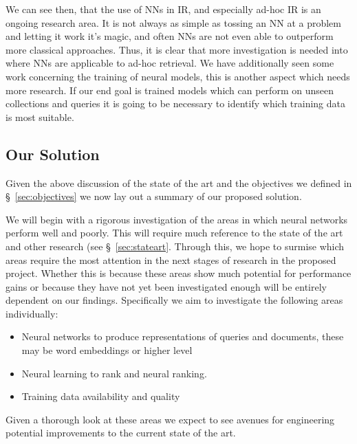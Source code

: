 \documentclass[11pt,english,twocolumn]{article}
\begin{document}
We can see then, that the use of NNs in IR, and especially ad-hoc IR is an ongoing research area. It is not always as simple as tossing an NN at a problem and letting it work it's magic, and often NNs are not even able to outperform more classical approaches.
Thus, it is clear that more investigation is needed into where NNs are applicable to ad-hoc retrieval.
We have additionally seen some work concerning the training of neural models, this is another aspect which needs more research. If our end goal is trained models which can perform on unseen collections and queries it is going to be necessary to identify which training data is most suitable.

\subsection{Our Solution}\label{sec:our-solution}
Given the above discussion of the state of the art and the objectives we defined in \S~\ref{sec:objectives} we now lay out a summary of our proposed solution.

We will begin with a rigorous investigation of the areas in which neural networks perform well and poorly. This will require much reference to the state of the art and other research (see \S~\ref{sec:stateart}. Through this, we hope to surmise which areas require the most attention in the next stages of research in the proposed project. Whether this is because these areas show much potential for performance gains or because they have not yet been investigated enough will be entirely dependent on our findings. Specifically we aim to investigate the following areas individually:
\begin{itemize}
\item{Neural networks to produce representations of queries and documents, these may be word embeddings or higher level}
\item{Neural learning to rank and neural ranking.}
\item{Training data availability and quality}
\end{itemize}

Given a thorough look at these areas we expect to see avenues for engineering potential improvements to the current state of the art.
\end{document}
